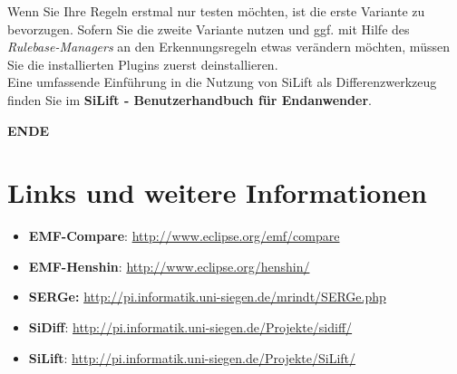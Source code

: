 \documentclass[a4paper]{scrartcl}
\begin{document}
\begin{enumerate}




\end{enumerate}

Wenn Sie Ihre Regeln erstmal nur testen möchten, ist die erste Variante zu bevorzugen. 
Sofern Sie die zweite Variante nutzen und ggf. mit Hilfe des \textit{Rulebase-Managers} an den Erkennungsregeln  etwas verändern möchten, müssen Sie die installierten Plugins zuerst deinstallieren.\\
Eine umfassende Einführung in die Nutzung von SiLift als Differenzwerkzeug finden Sie im \textbf{SiLift - Benutzerhandbuch für Endanwender}.


\begin{center}
\textbf{ENDE}
\end{center}

\newpage

\section{Links und weitere Informationen}

\begin{itemize}
\item \textbf{EMF-Compare}: \url{http://www.eclipse.org/emf/compare}
\item \textbf{EMF-Henshin}: \url{http://www.eclipse.org/henshin/}
\item \textbf{SERGe:} \url{http://pi.informatik.uni-siegen.de/mrindt/SERGe.php}
\item \textbf{SiDiff}: \url{http://pi.informatik.uni-siegen.de/Projekte/sidiff/}
\item \textbf{SiLift}: \url{http://pi.informatik.uni-siegen.de/Projekte/SiLift/}
\end{itemize} 
\end{document}
